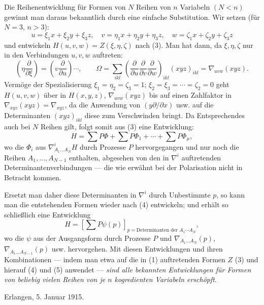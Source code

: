 Die Reihenentwicklung für Formen von $N$ Reihen von $n$ Variabeln $(N<n)$ gewinnt man daraus bekanntlich durch eine einfache Substitution. Wir setzen (für $N=3$, $n>3$):
\[
  u=\xi_1x+\xi_2y+\xi_3z,
  \quad v=\eta_1x+\eta_2y+\eta_3z,
  \quad w=\zeta_1x+\zeta_2y+\zeta_3z
\]
und entwickeln $H(u,v,w)=Z(\xi,\eta,\zeta)$ nach (3). Man hat dann, da $\xi,\eta,\zeta$ nur in den Verbindungen $u,v,w$ auftreten:
\[
  \left(\eta\frac{\partial}{\partial \xi}\right)=
  \left(v\frac{\partial}{\partial u}\right)\cdots,
  \qquad
  \Omega=\sum_{ikl}\left(\frac{\partial}{\partial u}
  \frac{\partial}{\partial v}
  \frac{\partial}{\partial w}\right)_{ikl}(xyz)_{ikl}
  =\nabla_{uvw}(xyz).
\]
Vermöge der Spezialisierung $\xi_1=\eta_2=\zeta_3=1$; $\xi_2=\xi_3=\cdots=\zeta_2=0$ geht $H(u,v,w)$ über in $H(x,y,z)$, $\nabla_{uvw}(xyz)$ bis auf einen Zahlfaktor in $\nabla_{xyz}(xyz)=\nabla_{xyz}$, da die Anwendung von $(y\partial/\partial x)$ usw. auf die Determinanten $(xyz)_{ikl}$ diese zum Verschwinden bringt. Da Entsprechendes auch bei $N$ Reihen gilt, folgt somit aus (3) eine Entwicklung:
\begin{equation}
  H=\sum P\Phi+\sum P\Phi_1+\cdots+\sum P\Phi_\mu,
\tag{4}
\end{equation}
wo die $\Phi_i$ aus $\nabla^i_{A_1\ldots A_N}H$ durch Prozesse $P$ hervorgegangen und nur noch die Reihen $A_1,
\ldots,A_{N-1}$ enthalten, abgesehen von den in $\nabla^i$ auftretenden Determinantenverbindungen --- die wie erwähnt bei der Polarisation nicht in Betracht kommen.

Ersetzt man daher diese Determinanten in $\nabla^i$ durch Unbestimmte $p$, so kann man die entstehenden Formen wieder nach (4) entwickeln; und erhält so schließlich eine Entwicklung
\begin{equation}
  H=\left[\sum P\psi(p)\right]_{p=\text{Determinanten der }A_1\cdots A_N},
\tag{5}
\end{equation}
wo die $\psi$ aus der Ausgangsform durch Prozesse $P$ und $\nabla_{A_1\ldots A_N}(p)$, $\nabla_{A_1\ldots A_{N-1}}(p)$ usw. hervorgehen. Mit diesen Entwicklungen und ihren Kombinationen --- indem man etwa auf die in (1) auftretenden Formen $Z$ (3) und hierauf (4) und (5) anwendet --- \emph{sind alle bekannten Entwicklungen für Formen von beliebig vielen Reihen von je $n$ kogredienten Variabeln erschöpft}.

Erlangen, 5. Januar 1915.



\clearpage
\setcounter{footnote}{0}

